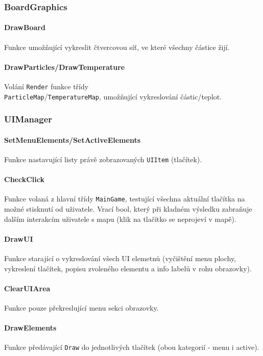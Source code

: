 \documentclass[a4paper, 12pt]{article}
\begin{document}
\subsubsection{BoardGraphics}
\paragraph{DrawBoard}
Funkce umožňující vykreslit čtvercovou síť, ve které všechny částice
žijí.

\paragraph{DrawParticles/DrawTemperature}
Volání \texttt{Render} funkce třídy \\\texttt{ParticleMap}/\texttt{TemperatureMap}, umožňující
vykreslování částic/teplot.

\subsubsection{UIManager}
\paragraph{SetMenuElements/SetActiveElements}
Funkce nastavující listy právě zobrazovaných \texttt{UIItem} (tlačítek).

\paragraph{CheckClick}
Funkce volaná z hlavní třídy \texttt{MainGame}, testující všechna aktuální
tlačítka na možné stisknutí od uživatele. Vrací bool, který při kladném
výsledku zabraňuje dalším interakcím uživatele s mapu (klik na tlačítko se
neprojeví v mapě).

\paragraph{DrawUI}
Funkce starající o vykreslování všech UI elemetnů (vyčištění menu plochy,
vykreslení tlačítek, popisu zvoleného elementu a info labelů v rohu obrazovky).

\paragraph{ClearUIArea}
Funkce pouze překreslující menu sekci obrazovky.

\paragraph{DrawElements}
Funkce předávající \texttt{Draw} do jednotlivých tlačítek (obou kategorií -
menu i active).
\end{document}
